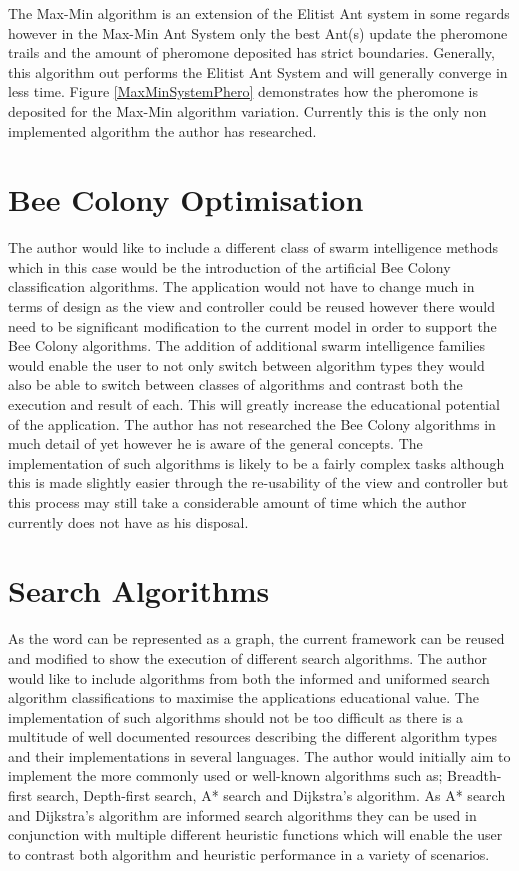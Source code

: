 The Max-Min algorithm is an extension of the Elitist Ant system in some regards however in the Max-Min Ant System only the best Ant(s) update the pheromone trails and the amount of pheromone deposited has strict boundaries. Generally, this algorithm out performs the Elitist Ant System and will generally converge in less time. Figure \ref{MaxMinSystemPhero} demonstrates how the pheromone is deposited for the Max-Min algorithm variation. Currently this is the only non implemented algorithm the author has researched.

\section{Bee Colony Optimisation}

The author would like to include a different class of swarm intelligence methods which in this case would be the introduction of the artificial Bee Colony classification algorithms. The application would not have to change much in terms of design as the view and controller could be reused however there would need to be significant modification to the current model in order to support the Bee Colony algorithms. The addition of additional swarm intelligence families would enable the user to not only switch between algorithm types they would also be able to switch between classes of algorithms and contrast both the execution and result of each. This will greatly increase the educational potential of the application. The author has not researched the Bee Colony algorithms in much detail of yet however he is aware of the general concepts. The implementation of such algorithms is likely to be a fairly complex tasks although this is made slightly easier through the re-usability of the view and controller but this process may still take a considerable amount of time which the author currently does not have as his disposal.

\section{Search Algorithms}

As the word can be represented as a graph, the current framework can be reused and modified to show the execution of different search algorithms. The author would like to include algorithms from both the informed and uniformed search algorithm classifications to maximise the applications educational value. The implementation of such algorithms should not be too difficult as there is a multitude of well documented resources describing the different algorithm types and their implementations in several languages. The author would initially aim to implement the more commonly used or well-known algorithms such as; Breadth-first search, Depth-first search, A* search and Dijkstra's algorithm. As A* search and Dijkstra's algorithm are informed search algorithms they can be used in conjunction with multiple different heuristic functions which will enable the user to contrast both algorithm and heuristic performance in a variety of scenarios.

